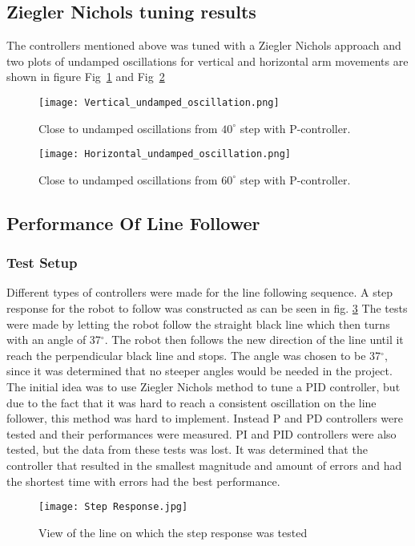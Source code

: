 \subsection{Ziegler Nichols tuning results}
The controllers mentioned above was tuned with a Ziegler Nichols approach and two plots of undamped oscillations for vertical and horizontal arm movements are shown in figure Fig~\ref{vert_osc} and Fig~\ref{Hor_osc}
\begin{figure}[H]
\centering
\texttt{[image: Vertical\_undamped\_oscillation.png]}
\caption{Close to undamped oscillations from \(40^{\circ}\) step with P-controller.}
\label{vert_osc}
\end{figure}
\begin{figure}[H]
\centering
\texttt{[image: Horizontal\_undamped\_oscillation.png]}
\caption{Close to undamped oscillations from \(60^{\circ}\) step with P-controller.}
\label{Hor_osc}
\end{figure}
\subsection{Performance Of Line Follower}

\subsubsection{Test Setup}
Different types of controllers were made for the line following sequence.  A step response for the robot to follow was constructed as can be seen in fig. \ref{Step Response} The tests were made by letting the robot follow the straight black line which then turns with an angle of 37$^{\circ}$. The robot then follows the new direction of the line until it reach the perpendicular black line and stops. The angle was chosen to be 37$^{\circ}$, since it was determined that no steeper angles would be needed in the project. The initial idea was to use Ziegler Nichols method to tune a PID controller, but due to the fact that it was hard to reach a consistent oscillation on the line follower, this method was hard to implement. Instead P and PD controllers were tested and their performances were measured. PI and PID controllers were also tested, but the data from these tests was lost. It was determined that the controller that resulted in the smallest magnitude and amount of errors and had the shortest time with errors had the best performance. 


\begin{figure}[H]
    \centering
    \texttt{[image: Step Response.jpg]}
    \caption{View of the line on which the step response was tested}
    \label{Step Response}
\end{figure}

